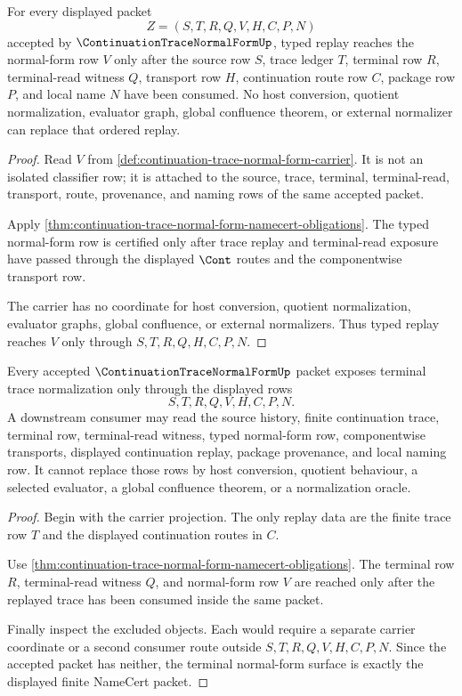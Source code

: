 \begin{theorem}
\label{thm:continuation-trace-normal-form-typed-replay-obligation}
For every displayed packet
$$
Z=(S,T,R,Q,V,H,C,P,N)
$$
accepted by $\ContinuationTraceNormalFormUp$, typed replay reaches the normal-form row $V$ only after the source row $S$, trace ledger $T$, terminal row $R$, terminal-read witness $Q$, transport row $H$, continuation route row $C$, package row $P$, and local name $N$ have been consumed. No host conversion, quotient normalization, evaluator graph, global confluence theorem, or external normalizer can replace that ordered replay.
\end{theorem}
\begin{proof}
Read $V$ from \autoref{def:continuation-trace-normal-form-carrier}. It is not an isolated classifier row; it is attached to the source, trace, terminal, terminal-read, transport, route, provenance, and naming rows of the same accepted packet.

Apply \autoref{thm:continuation-trace-normal-form-namecert-obligations}. The typed normal-form row is certified only after trace replay and terminal-read exposure have passed through the displayed $\Cont$ routes and the componentwise transport row.

The carrier has no coordinate for host conversion, quotient normalization, evaluator graphs, global confluence, or external normalizers. Thus typed replay reaches $V$ only through $S,T,R,Q,H,C,P,N$.
\end{proof}

\begin{theorem}
\label{thm:continuation-trace-normal-form-non-escape}
Every accepted $\ContinuationTraceNormalFormUp$ packet exposes terminal trace normalization only through the displayed rows
$$
S,T,R,Q,V,H,C,P,N.
$$
A downstream consumer may read the source history, finite continuation trace, terminal row, terminal-read witness, typed normal-form row, componentwise transports, displayed continuation replay, package provenance, and local naming row. It cannot replace those rows by host conversion, quotient behaviour, a selected evaluator, a global confluence theorem, or a normalization oracle.
\end{theorem}
\begin{proof}
Begin with the carrier projection. The only replay data are the finite trace row $T$ and the displayed continuation routes in $C$.

Use \autoref{thm:continuation-trace-normal-form-namecert-obligations}. The terminal row $R$, terminal-read witness $Q$, and normal-form row $V$ are reached only after the replayed trace has been consumed inside the same packet.

Finally inspect the excluded objects. Each would require a separate carrier coordinate or a second consumer route outside $S,T,R,Q,V,H,C,P,N$. Since the accepted packet has neither, the terminal normal-form surface is exactly the displayed finite NameCert packet.
\end{proof}

